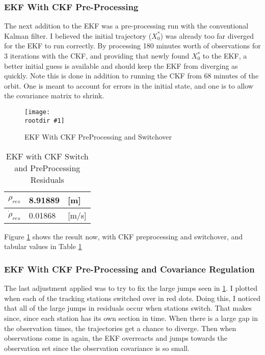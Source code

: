 \documentclass[12pt,a4paper,oneside]{article}
\numberwithin{equation}{section}   		%
\newcommand{\rootdir}{./Figures/}
\newcommand{\fig}[3]{
			\begin{figure}
				\centering
				\texttt{[image: \\rootdir \#1]}
				\caption{#2}
				\label{#3}
			\end{figure}
			}
\begin{document}
\subsubsection{EKF With CKF Pre-Processing}
\label{sec:EKF Kalman PP}

The next addition to the EKF was a pre-processing run with the conventional Kalman filter. I believed the initial trajectory ($X^*_0$) was already too far diverged for the EKF to run correctly. By processing 180 minutes worth of observations for 3 iterations with the CKF, and providing that newly found $X^*_0$ to the EKF, a better initial guess is available and should keep the EKF from diverging as quickly. Note this is done in addition to running the CKF from 68 minutes of the orbit. One is meant to account for errors in the initial state, and one is to allow the covariance matrix to shrink. 

\fig{EKF3.eps}{EKF With CKF PreProcessing and Switchover}{fig:EKF3}

\begin{table}[H]
\centering
	\begin{tabular}{|l|l|l|}
		\hline
		$\rho_{res}$		&	8.91889 		& [m]		\\\hline
		$\dot{\rho}_{res}$	&	0.01868 	& [m/s] 	\\\hline
	\end{tabular}
	\caption{EKF with CKF Switch and PreProcessing Residuals}
	\label{tab:EKF3}
\end{table}


Figure \ref{fig:EKF3} shows the result now, with CKF preprocessing and switchover, and tabular values in Table \ref{tab:EKF3}




\subsubsection{EKF With CKF Pre-Processing and Covariance Regulation}
\label{sec:EKF Kalman PP CC}

The last adjustment applied was to try to fix the large jumps seen in \ref{fig:EKF3}. I plotted when each of the tracking stations switched over in red dots. Doing this, I noticed that all of the large jumps in residuals occur when stations switch. That makes since, since each station has its own section in time. When there is a large gap in the observation times, the trajectories get a chance to diverge. Then when observations come in again, the EKF overreacts and jumps towards the observation set since the observation covariance is so small. 
\end{document}
